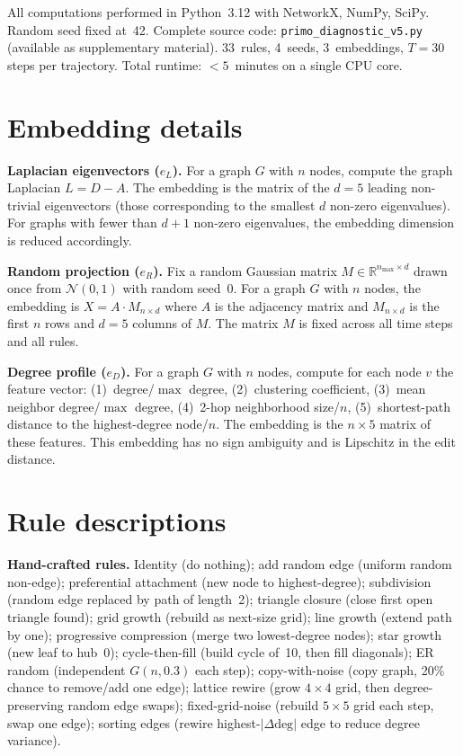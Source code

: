 \documentclass{../shared/primo}
\begin{document}
All computations performed in Python~3.12 with NetworkX, NumPy, SciPy. Random seed fixed at~42. Complete source code: \texttt{primo\_diagnostic\_v5.py} (available as supplementary material). 33~rules, 4~seeds, 3~embeddings, $T = 30$ steps per trajectory. Total runtime: $< 5$~minutes on a single CPU core.

\section{Embedding details}
\label{app:embeddings}

\textbf{Laplacian eigenvectors ($e_L$).} For a graph $G$ with $n$ nodes, compute the graph Laplacian $L = D - A$. The embedding is the matrix of the $d = 5$ leading non-trivial eigenvectors (those corresponding to the smallest $d$ non-zero eigenvalues). For graphs with fewer than $d + 1$ non-zero eigenvalues, the embedding dimension is reduced accordingly.

\textbf{Random projection ($e_R$).} Fix a random Gaussian matrix $M \in \mathbb{R}^{n_{\max} \times d}$ drawn once from $\mathcal{N}(0, 1)$ with random seed~0. For a graph $G$ with $n$ nodes, the embedding is $X = A \cdot M_{n \times d}$ where $A$ is the adjacency matrix and $M_{n \times d}$ is the first $n$ rows and $d = 5$ columns of $M$. The matrix $M$ is fixed across all time steps and all rules.

\textbf{Degree profile ($e_D$).} For a graph $G$ with $n$ nodes, compute for each node $v$ the feature vector: (1)~degree/$\max$ degree, (2)~clustering coefficient, (3)~mean neighbor degree/$\max$ degree, (4)~2-hop neighborhood size/$n$, (5)~shortest-path distance to the highest-degree node/$n$. The embedding is the $n \times 5$ matrix of these features. This embedding has no sign ambiguity and is Lipschitz in the edit distance.

\section{Rule descriptions}
\label{app:rules}

\textbf{Hand-crafted rules.} Identity (do nothing); add random edge (uniform random non-edge); preferential attachment (new node to highest-degree); subdivision (random edge replaced by path of length~2); triangle closure (close first open triangle found); grid growth (rebuild as next-size grid); line growth (extend path by one); progressive compression (merge two lowest-degree nodes); star growth (new leaf to hub~0); cycle-then-fill (build cycle of~10, then fill diagonals); ER random (independent $G(n, 0.3)$ each step); copy-with-noise (copy graph, 20\% chance to remove/add one edge); lattice rewire (grow $4 \times 4$ grid, then degree-preserving random edge swaps); fixed-grid-noise (rebuild $5 \times 5$ grid each step, swap one edge); sorting edges (rewire highest-$|\Delta\text{deg}|$ edge to reduce degree variance).
\end{document}
